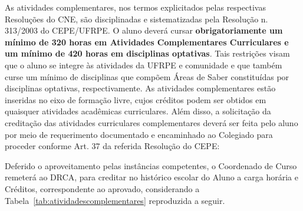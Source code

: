 \documentclass[
	12pt,				%
	openright,			%
  oneside,     %
	a4paper,			%
	english,			%
	french,				%
	spanish,			%
	brazil				%
	]{abntex2}
\begin{document}
As atividades complementares,  nos termos explicitados pelas respectivas
Resoluções do CNE, são disciplinadas  e sistematizadas pela Resolução n.
313/2003 do CEPE/UFRPE. O aluno deverá cursar  \textbf{obrigatoriamente um
mínimo de 320 horas em Atividades Complementares Curriculares e um mínimo de 420 horas em
disciplinas optativas}. Tais restrições visam que o aluno se integre  às atividades da UFRPE e comunidade e
que também curse um mínimo de disciplinas  que compõem Áreas de Saber
constituídas por disciplinas optativas,  respectivamente. As atividades
complementares estão inseridas no eixo de  formação livre, cujos créditos podem
ser obtidos em quaisquer atividades acadêmicas  curriculares. Além disso, a
solicitação da creditação das atividades curriculares  complementares deverá ser
feita pelo aluno por meio de requerimento documentado e  encaminhado ao
Colegiado para proceder conforme Art. 37 da referida  Resolução do CEPE:

Deferido o aproveitamento pelas instâncias competentes,  o Coordenado de Curso
remeterá ao DRCA, para creditar no histórico escolar do  Aluno a carga horária e
Créditos, correspondente ao aprovado, considerando a Tabela~\ref{tab:atividadescomplementares} reproduzida a seguir.
\end{document}
